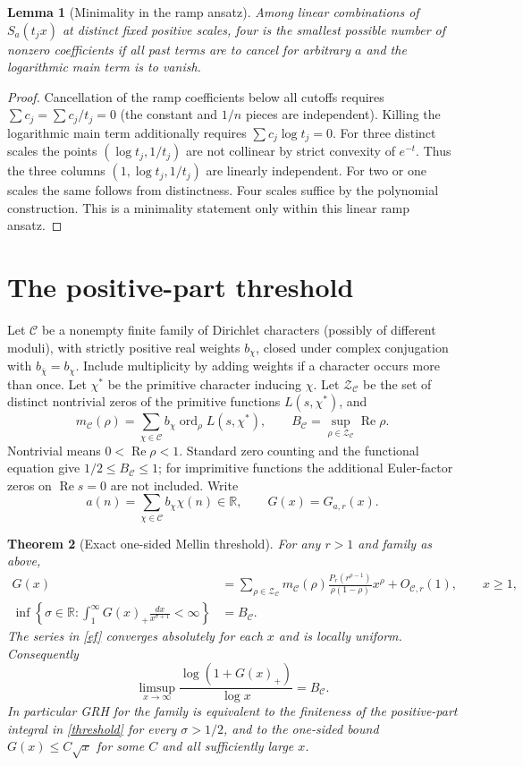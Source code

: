 \documentclass[11pt]{article}
\newtheorem{theorem}{Theorem}
\newtheorem{lemma}[theorem]{Lemma}
\theoremstyle{remark}\newtheorem{remark}[theorem]{Remark}
\newcommand{\Rea}{\operatorname{Re}}
\newcommand{\C}{\mathcal C}
\newcommand{\Z}{\mathcal Z}
\begin{document}
\begin{lemma}[Minimality in the ramp ansatz]\label{min}
Among linear combinations of $S_a(t_jx)$ at distinct fixed positive scales, four is the smallest possible number of nonzero coefficients if all past terms are to cancel for arbitrary $a$ and the logarithmic main term is to vanish.
\end{lemma}
\begin{proof}
Cancellation of the ramp coefficients below all cutoffs requires $\sum c_j=\sum c_j/t_j=0$ (the constant and $1/n$ pieces are independent). Killing the logarithmic main term additionally requires $\sum c_j\log t_j=0$. For three distinct scales the points $(\log t_j,1/t_j)$ are not collinear by strict convexity of $e^{-t}$. Thus the three columns $(1,\log t_j,1/t_j)$ are linearly independent. For two or one scales the same follows from distinctness. Four scales suffice by the polynomial construction. This is a minimality statement only within this linear ramp ansatz.
\end{proof}

\section{The positive-part threshold}
Let $\C$ be a nonempty finite family of Dirichlet characters (possibly of different moduli), with strictly positive real weights $b_\chi$, closed under complex conjugation with $b_{\bar\chi}=b_\chi$. Include multiplicity by adding weights if a character occurs more than once. Let $\chi^*$ be the primitive character inducing $\chi$. Let $\Z_\C$ be the set of distinct nontrivial zeros of the primitive functions $L(s,\chi^*)$, and
\[
 m_\C(\rho)=\sum_{\chi\in\C} b_\chi\operatorname{ord}_{\rho}L(s,\chi^*),\qquad
 B_\C=\sup_{\rho\in\Z_\C}\Rea\rho.
\]
Nontrivial means $0<\Rea\rho<1$. Standard zero counting and the functional equation give $1/2\le B_\C\le1$; for imprimitive functions the additional Euler-factor zeros on $\Rea s=0$ are not included. Write
\[
 a(n)=\sum_{\chi\in\C} b_\chi\chi(n)\in\mathbb R,\qquad G(x)=G_{a,r}(x).
\]

\begin{theorem}[Exact one-sided Mellin threshold]\label{main}
For any $r>1$ and family as above,
\begin{align}
 G(x)&=\sum_{\rho\in\Z_\C} m_\C(\rho)
 \frac{P_r(r^{\rho-1})}{\rho(1-\rho)}x^\rho+O_{\C,r}(1),\qquad x\ge1,\label{ef}\\
 \inf\left\{\sigma\in\mathbb R:\int_1^\infty G(x)_+\frac{dx}{x^{\sigma+1}}<\infty\right\}&=B_\C.\label{threshold}
\end{align}
The series in \eqref{ef} converges absolutely for each $x$ and is locally uniform. Consequently
\begin{equation}\label{limsup}
 \limsup_{x\to\infty}\frac{\log(1+G(x)_+)}{\log x}=B_\C.
\end{equation}
In particular GRH for the family is equivalent to the finiteness of the positive-part integral in \eqref{threshold} for every $\sigma>1/2$, and to the one-sided bound $G(x)\le C\sqrt x$ for some $C$ and all sufficiently large $x$.
\end{theorem}
\end{document}
